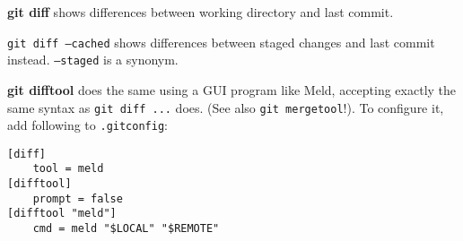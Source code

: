 %

\textbf{git diff} shows differences between working directory and last commit.

\texttt{git diff --cached} shows differences between staged changes and last commit instead.
\texttt{--staged} is a synonym.

\textbf{git difftool} does the same using a GUI program like Meld, accepting exactly the same syntax as \texttt{git diff ...} does.
(See also \texttt{git mergetool}!).
To configure it, add following to \texttt{.gitconfig}:
\begin{verbatim}
[diff]
    tool = meld
[difftool]
    prompt = false
[difftool "meld"]
    cmd = meld "$LOCAL" "$REMOTE"
\end{verbatim}

%